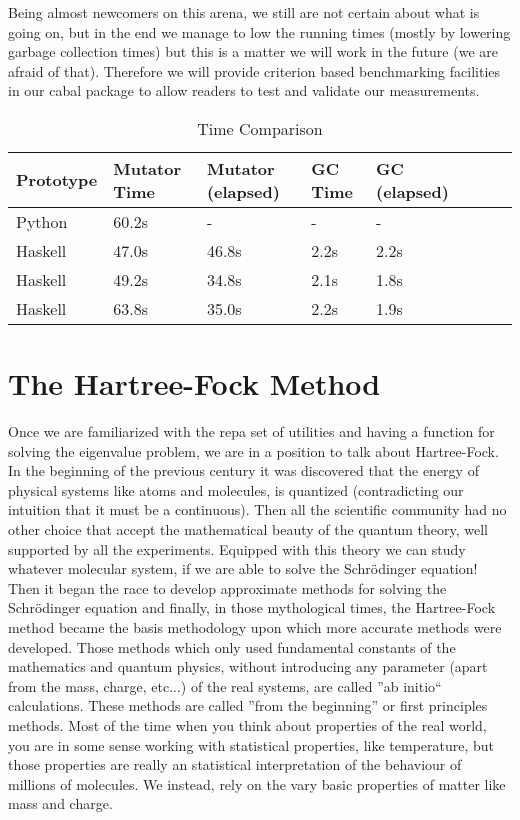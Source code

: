 \documentclass{tmr}
\begin{document}
Being almost newcomers on this arena, we still are not certain about what is going on,
but in the end we manage to low the running times (mostly by lowering garbage collection times)
but this is a matter we will work in the future (we are afraid of that). Therefore we will
provide criterion based benchmarking facilities in our cabal package to allow 
readers to test and validate our measurements.



\begin{table}[float,captionpos=b,belowcaptionskip=4pt]
\begin{center}
    \begin{tabular}{ | l | l | l | l | l | l | l| l |}
\hline  Prototype  & Mutator Time & Mutator (elapsed) & GC Time & GC (elapsed) \\ 
\hline  Python   & 60.2s   & -      & -    & - \\
\hline  Haskell  & 47.0s   & 46.8s  & 2.2s & 2.2s \\
\hline  Haskell  & 49.2s   & 34.8s  & 2.1s & 1.8s \\
\hline  Haskell  & 63.8s   & 35.0s  & 2.2s & 1.9s  \\
\hline
    \end{tabular} 
\end{center}
\label{tab:second}
\caption{Time Comparison}
\end{table}



\section{The Hartree-Fock Method}

Once we are familiarized with the repa set of utilities and having
a function for solving the eigenvalue problem, we are in a position to talk about
Hartree-Fock. In the beginning of the previous century it was discovered
that the energy of physical systems like atoms and molecules, is quantized (contradicting our intuition
that it must be a continuous). Then all the scientific community had no other choice that accept
the mathematical beauty of the quantum theory, well supported by all the experiments.
 Equipped with this theory we can study whatever molecular system,
if we are able to solve the Schr\"{o}dinger equation!
Then it began the race to develop approximate methods for solving the Schr\"{o}dinger equation and
finally, in those mythological times, the Hartree-Fock method became
the basis methodology upon which more accurate methods were developed.
Those methods which only used fundamental constants of the mathematics and quantum physics, without introducing
any parameter (apart from the mass, charge, etc...) of the real systems, are called ''ab initio`` calculations. 
These methods are called ''from the beginning'' or first principles methods. Most of the time when you think
about properties of the real world, you are in some sense working with statistical properties, like temperature,
but those properties are really an statistical interpretation of the behaviour of millions of molecules. We instead,
rely on the vary basic properties of matter like mass and charge.
\end{document}

